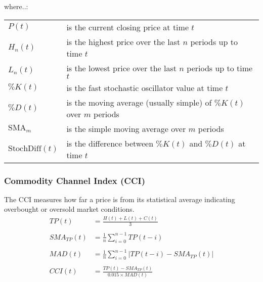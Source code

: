 \documentclass[a4paper,12pt]{report}
\begin{document}
\begin{minipage}{\textwidth}

where..:\\

\begin{tabularx}{\textwidth}{@{}l@{\hspace{2em}--\hspace{2em}}X@{}}
  $P(t)$         & is the current closing price at time $t$ \\
  $H_n(t)$       & is the highest price over the last $n$ periods up to time $t$ \\
  $L_n(t)$       & is the lowest price over the last $n$ periods up to time $t$ \\
  $\%K(t)$       & is the fast stochastic oscillator value at time $t$ \\
  $\%D(t)$       & is the moving average (usually simple) of $\%K(t)$ over $m$ periods \\
  $\text{SMA}_m$ & is the simple moving average over $m$ periods \\
  $\text{StochDiff}(t)$ & is the difference between $\%K(t)$ and $\%D(t)$ at time $t$ \\
\end{tabularx}

\end{minipage}

			\subsubsection{Commodity Channel Index (CCI)}

The CCI measures how far a price is from its statistical average indicating overbought or oversold market conditions. \cite{26}\\

\begin{equation}
\begin{aligned}
  TP(t) &= \frac{H(t) + L(t) + C(t)}{3} \\\\
  SMA_{TP}(t) &= \frac{1}{n} \sum_{i=0}^{n-1} TP(t-i) \\\\
  MAD(t) &= \frac{1}{n} \sum_{i=0}^{n-1} |TP(t-i) - SMA_{TP}(t)| \\\\
  CCI(t) &= \frac{TP(t) - SMA_{TP}(t)}{0.015 \times MAD(t)} \\\\
\end{aligned}
\end{equation}
\end{document}
